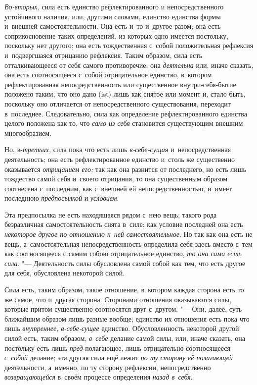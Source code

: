 {\em Во-вторых,} сила есть единство рефлектированного и
непосредственного устойчивого наличия, или, другими словами, единство
единства формы и~внешней самостоятельности. Она есть и~то и~другое разом;
она есть соприкосновение таких определений, из которых одно имеется
постольку, поскольку нет другого; она есть тождественная с~собой
положительная рефлексия и~подвергшаяся отрицанию рефлексия. Таким образом,
сила есть отталкивающееся от себя самого противоречие; она
{\em деятельна} или, иначе сказать, она есть
соотносящееся с~собой отрицательное единство, в~котором рефлектированная
непосредственность или существенное внутри-себя-бытие положено таким, что
оно дано (ist) лишь как снятое или момент и, стало быть, поскольку оно
отличается от непосредственного существования, переходит в~последнее.
Следовательно, сила как определение рефлектированного единства целого
положена как то, что {\em само из себя} становится
существующим внешним многообразием.

Но, в-{\em третьих,} сила пока что есть лишь
{\em в-себе-сущая} и~непосредственная деятельность; она
есть рефлектированное единство и~столь же существенно оказывается
{\em отрицанием его;} так как она разнится от
последнего, но есть лишь тождество самой себя и~своего отрицания, то она
существенным образом соотнесена с~последним, как с~внешней ей
непосредственностью, и~имеет последнюю {\em предпосылкой} и {\em условием}.

Эта предпосылка не есть находящаяся рядом с~нею вещь; такого рода
безразличная самостоятельность снята в~силе; как условие последней она есть
{\em некоторое другое по отношению к~ней
самостоятельное}. Но так как она есть не вещь, а~самостоятельная
непосредственность определила себя здесь вместо с~тем как соотносящееся с
самим собою отрицательное единство, {\em то она сама
есть сила}. "--- Деятельность силы обусловлена самой собой как тем, что есть
другое для себя, обусловлена некоторой силой.

Сила есть, таким образом, такое отношение, в~котором каждая сторона есть то
же самое, что и~другая сторона. Сторонами отношения оказываются силы,
которые притом существенно соотносятся друг с~другом. "--- Они, далее, суть
ближайшим образом лишь разные вообще; единство их отношения есть пока что
лишь {\em внутреннее, в-себе-сущее} единство.
Обусловленность некоторой другой силой есть, таким образом,
{\em в~себе} делание самой силы, или, иначе сказать,
она постольку есть лишь {\em пред}{}-полагающее, лишь
отрицательно соотносящееся {\em с~собой} делание; эта
другая сила ещё лежит {\em по ту сторону её полагающей}
деятельности, а~именно, по ту сторону рефлексии, непосредственно
{\em возвращающейся} в~своём процессе определения
{\em назад в~себя}.


